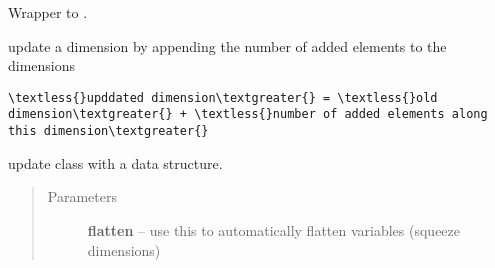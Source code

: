 \documentclass[letterpaper,10pt,english]{sphinxmanual}
\begin{document}
\begin{fulllineitems}
\begin{fulllineitems}
\begin{quote}
\begin{description}
\end{description}\end{quote}

\end{fulllineitems}


\begin{fulllineitems}
\label{altimetry.data:altimetry.data.hydro_data.update}
Wrapper to {\hyperref[altimetry.data:altimetry.data.hydro_data.update_with_slice]{}}.

\end{fulllineitems}


\begin{fulllineitems}
\label{altimetry.data:altimetry.data.hydro_data.update_Dim}
update a dimension by appending the number of added elements to the dimensions

\begin{Verbatim}[commandchars=\\\{\}]
\textless{}upddated dimension\textgreater{} = \textless{}old dimension\textgreater{} + \textless{}number of added elements along this dimension\textgreater{}
\end{Verbatim}

\end{fulllineitems}


\begin{fulllineitems}
\label{altimetry.data:altimetry.data.hydro_data.update_dataset}
update class with a data structure.
\begin{quote}\begin{description}
\item[{Parameters}] \leavevmode
\textbf{flatten} -- use this to automatically flatten variables (squeeze dimensions)

\end{description}\end{quote}

\end{fulllineitems}


\end{fulllineitems}
\end{document}
